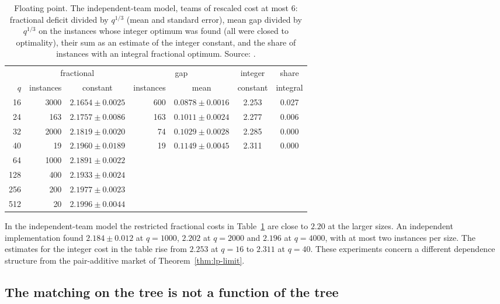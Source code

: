 \begin{table}[ht]
\caption{Floating point. The independent-team model, teams of rescaled cost at most $6$:
fractional deficit divided by $q^{1/3}$ (mean and standard error), mean gap divided by $q^{1/3}$ on the instances
whose integer optimum was found (all were closed to optimality), their sum as an estimate of
the integer constant, and the share of instances with an integral fractional optimum. Source:
\protect{}.}\label{tab:discussion-iid}
\small
\begin{tabular}{@{}rrcrccc@{}}
\toprule
 & \multicolumn{2}{c}{fractional} & \multicolumn{2}{c}{gap} & integer & share \\
$q$ & instances & constant & instances & mean & constant & integral \\
\midrule
16 & 3000 & $2.1654\pm0.0025$ & 600 & $0.0878\pm0.0016$ & 2.253 & 0.027 \\
24 & 163 & $2.1757\pm0.0086$ & 163 & $0.1011\pm0.0024$ & 2.277 & 0.006 \\
32 & 2000 & $2.1819\pm0.0020$ & 74 & $0.1029\pm0.0028$ & 2.285 & 0.000 \\
40 & 19 & $2.1960\pm0.0189$ & 19 & $0.1149\pm0.0045$ & 2.311 & 0.000 \\
64 & 1000 & $2.1891\pm0.0022$ & & & & \\
128 & 400 & $2.1933\pm0.0024$ & & & & \\
256 & 200 & $2.1977\pm0.0023$ & & & & \\
512 & 20 & $2.1996\pm0.0044$ & & & & \\
\bottomrule
\end{tabular}
\end{table}

In the independent-team model the restricted fractional costs in
Table~\ref{tab:discussion-iid} are close to $2.20$ at the larger sizes. An independent
implementation found $2.184\pm0.012$ at $q=1000$, $2.202$ at $q=2000$ and $2.196$
at $q=4000$, with at most two instances per size. The estimates for the integer cost
in the table rise from $2.253$ at $q=16$ to $2.311$ at $q=40$. These experiments concern
a different dependence structure from the pair-additive market of
Theorem~\ref{thm:lp-limit}.

\subsection{The matching on the tree is not a function of the tree}
\label{sec:discussion-endogeny}

